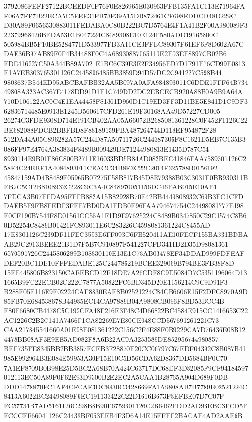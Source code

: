 \documentclass[UTF8,fontset=fandol,zihao=-4,a4paper]{ctexart}
\begin{document}
{{3792086FEFF27122BCEEDF0F76F0E826965E030963FFB135FA1C113E71964FAF06A7FF7B22BCA5C5EEE31FB73F39A15DB872461CF698EDDCD48D229C
D30A89F0656530883011FEDABA0C80B222BC7D5764E4F1A41B2F00A980089F322379968426BEDA53E1B047224C8489308E10E124F580ADD19165800C
505984BB5F10BE5284771D533977FB3A11CE3FFBC89307F61EF6F8D602A67CDAE36B97AB89F0F4B34488F0C4A68930887065110E2E03EE8897CB02B6
FDE416227C50A344B89A7021E1BC6C39E3E2F34956ED7D1F91F76CD99E0813E1A7EB303765301126C2445806485BB3859D94D57DC2C941227C598B44
9808637B544ED95ABCBAFBB32AA5B097A0AFA984893011C6DDE1FFF64B73449808A323AC367E4178DD91D1F1C749DD2DC2EBCECB920A88B0A9B9A64A
710D106122AC0C4E1EA44458F81361D960D1C19ED3FF3D11BE5E841D1C9DF362836714485E0913E1245D560617CFD261E19F30168AA49D57227CD005
26274C3FDE9308D714E191CB402AA05A66072B2685081361228C0F452F1126C22BE682088FDCB2BBFBD8F88189159FBA487264744D118EF954872F28
512DA44A05C896282A57C244D87A50711726C244387306F8C1621D5EB7C135B3086FF97E4764A383834F8489B009429DE71244980813E1435D787C54
8930114E9B01F86C800B2711E16033BD5B84AD082BEC41846FAA7589301126C258E4C24BBF1A4084893011CEACC34B8F3C22C2014F325788B0156192
45847159AD4B8489F05965B0F275F58B817B45D8E79388B03C3031F0BB930311BEB2C5C12B8108932C228C9C3A4C848970051156DC46EAB015E10AE1
7FDCA3B07FFDA95FFFB882A15B82928B70E42BB4449808932C69B3EC1CFDDAEB5F9FB8FEDF3FFE7BD0DA1FDB0E96FAA794674754C24498081777E198
F0CF190B7544F8D01561CC55A1F1D9E97625224C8489B0347850C29C1574C8B60D52254C8489B01421FC893011E6C283226C4598081361224C8455AD
17E8301126C239DF11FEC3593E6FF093C6FB520411AE10FECF155BA331BDBAAB29C2913BEEE21B1D7F5B7C910897F541227CFD3411D2D35D98081361
6570591726C2445806289B108830110E13E1C78AB03478EF34DDAD999FDFEAFDEF20BC1DB10FFFEDABE125C244786219BCEE329069B794BE3FB38F8D
15FE445806B823150CAEEBCD12E18DE7A26CDF8C9D5084D7C5351196064D131665B9FC22ECB02C222C7877A50822FC6BD345D20E1156214C9C9D91F3
B288F05E116E9F02224CAF8830EAE8B02521224C84CB6606E15F2DFC8970A9D85FB70E684538678B44985EC14CA97889B04A9808CB096F8BD53BCC4B
F80F6680CB4478C5C192CFA48F216E3F48C4D66822BC4584E915CC1416653C22AC1226C2B2C141A7466F1CA82269E7E80CE048CCD567691261221C73
CAA217845541660A01E98E081361222C156C2F4E88F0B9229CA7D76436E08B124478BB08AF3E9EE5AD082F8A6B22AC0A3253589DE852956744980857
BEF735FE8345BB2BB3857FCEB3F28870F20CC06797C67EDF04392C8B087B41985E992964B3E084E59953A30F15E10C5D56CDA62D8367DD5684BF0C70
7A1EF8709B0B98E25D5BC2A68B70A424C63717DC68DF3D82085F9CF94184597012113EC50A89F0F62E93D9300B2E2EC2A5CAA1B28765A904D689F0DB
DDD1478870FC1AF4CFCAF3DC8830C3428669FA1A9808AB7B7789B02521224C8413A6022BC24498089F6EC191133422C22D1616B673F8EFBE07D7C07F
FC57731B7AD5161126C298B8B90E6759301126C2B6462FDD2AD93EBC3FCD5FFCCCFF66041126C24438BF053FEB4F3D6A14E15FFFF2BACAE4AD2AAE6B
}}
\end{document}
